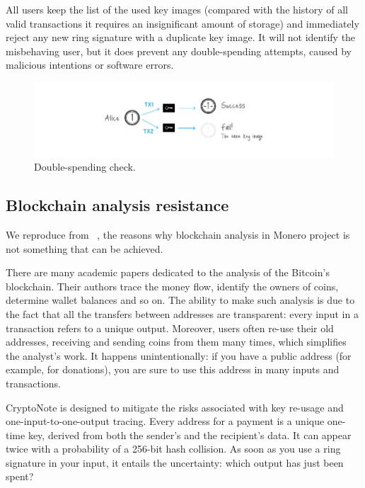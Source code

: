 All users keep the list of the used key images (compared with the history of all valid transactions it requires an insignificant amount of storage) and immediately reject any new ring signature with a duplicate key image. It will not identify the misbehaving user, but it does prevent any double-spending attempts, caused by malicious intentions or software errors.

\begin{figure}[H]
  \centering
  \includegraphics[width=1 \columnwidth,keepaspectratio]{Images/CryptoNote/double_spending.png}
  \caption{Double-spending check.~\cite{cryptonote}}
  \label{fig:double_spending}
\end{figure}

\subsection{Blockchain analysis resistance}
We reproduce from ~\cite{cryptonote}, the reasons why blockchain analysis in Monero project is not something that can be achieved.

There are many academic papers dedicated to the analysis of the Bitcoin's blockchain. Their authors trace the money flow, identify the owners of coins, determine wallet balances and so on. The ability to make such analysis is due to the fact that all the transfers between addresses are transparent: every input in a transaction refers to a unique output. Moreover, users often re-use their old addresses, receiving and sending coins from them many times, which simplifies the analyst's work. It happens unintentionally: if you have a public address (for example, for donations), you are sure to use this address in many inputs and transactions.

CryptoNote is designed to mitigate the risks associated with key re-usage and one-input-to-one-output tracing. Every address for a payment is a unique one-time key, derived from both the sender's and the recipient's data. It can appear twice with a probability of a 256-bit hash collision. As soon as you use a ring signature in your input, it entails the uncertainty: which output has just been spent?

